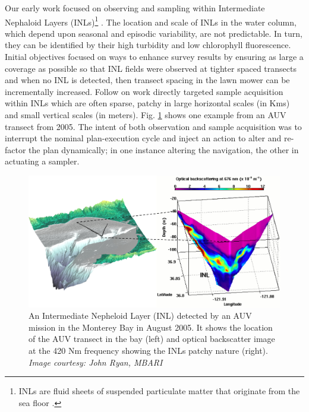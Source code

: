 Our early work focused on observing and sampling within Intermediate
Nephaloid Layers (INLs)\footnote{INLs are fluid sheets of suspended
  particulate matter that originate from the sea floor
  \cite{mcphee-shaw2006}.} \cite{ryan10}. The location and scale of
INLs in the water column, which depend upon seasonal and episodic
variability, are not predictable. In turn, they can be identified by
their high turbidity and low chlorophyll fluorescence. Initial
objectives focused on ways to enhance survey results by ensuring as
large a coverage as possible so that INL fields were observed at
tighter spaced transects and when no INL is detected, then transect
spacing in the lawn mower can be incrementally increased. Follow on
work directly targeted sample acquisition within INLs which are often
sparse, patchy in large horizontal scales (in Kms) and small vertical
scales (in meters). Fig. \ref{fig:inl} shows one example from an AUV
transect from 2005. The intent of both observation and sample
acquisition was to interrupt the nominal plan-execution cycle and
inject an action to alter and re-factor the plan dynamically; in one
instance altering the navigation, the other in actuating a sampler.

\begin{figure}[b]
\centering
\includegraphics[scale=0.65]{figs/inl.jpg}
\caption{\small An Intermediate Nepheloid Layer (INL) detected by an
  AUV mission  in the Monterey
  Bay in August 2005. It shows the location of the AUV transect in the
  bay (left) and optical backscatter image at the 420 Nm frequency
  showing the INLs patchy nature (right). \emph{Image courtesy: John
    Ryan, MBARI}}
\label{fig:inl}
\end{figure}

